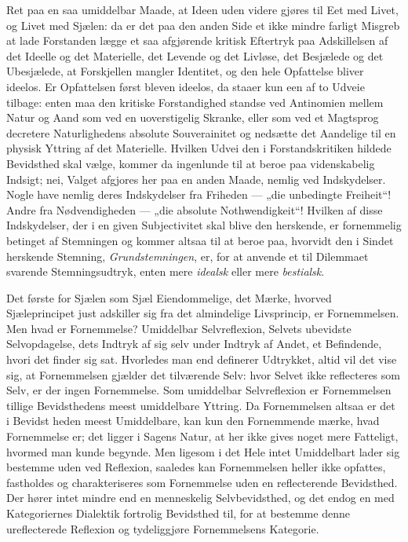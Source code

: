 \documentclass[11pt]{book}
\newcommand{\opage}[1]{\marginnote{\footnotesize\textit{[#1]}}}
\begin{document}
Ret paa en saa umiddelbar Maade, at Ideen uden videre gjøres til Eet med
Livet, og Livet med Sjælen:
\opage{335} \setcounter{footnote}{0}%
da er det paa den anden Side et ikke mindre farligt Misgreb at lade
Forstanden lægge et saa afgjørende kritisk Eftertryk paa Adskillelsen af det
Ideelle og det Materielle, det Levende og det Livløse, det Besjælede og det
Ubesjælede, at Forskjellen mangler Identitet, og den hele Opfattelse bliver
ideelos. Er Opfattelsen først bleven ideelos,
da staaer kun een af to Udveie tilbage: enten maa den kritiske Forstandighed
standse ved Antinomien mellem Natur og Aand som ved en uoverstigelig Skranke,
eller som ved et Magtsprog decretere Naturlighedens absolute Souverainitet og
nedsætte det Aandelige til en physisk Yttring af det Materielle. Hvilken
Udvei den i Forstandskritiken hildede Bevidsthed skal vælge, kommer da
ingenlunde til at beroe paa videnskabelig Indsigt; nei, Valget afgjores her
paa en anden Maade, nemlig ved Indskydelser. Nogle have nemlig deres
Indskydelser fra Friheden --- „die unbedingte Freiheit“! Andre fra
Nødvendigheden --- „die absolute Nothwendigkeit“! Hvilken af disse
Indskydelser, der i en given Subjectivitet skal blive den herskende, er
fornemmelig betinget af Stemningen og kommer altsaa til at beroe paa,
hvorvidt den i Sindet herskende Stemning, \emph{Grundstemningen}, er, for at
anvende et til Dilemmaet svarende Stemningsudtryk, enten mere \emph{idealsk}
eller mere \emph{bestialsk}.

Det første for Sjælen som Sjæl Eiendommelige, det Mærke, hvorved
Sjæleprincipet just adskiller sig fra det almindelige Livsprincip, er
Fornemmelsen. Men hvad er Fornemmelse? Umiddelbar Selvreflexion, Selvets
ubevidste Selvopdagelse, dets Indtryk af sig selv under Indtryk af Andet, et
Befindende, hvori det finder sig sat. Hvorledes man end definerer Udtrykket,
altid vil det vise sig, at Fornemmelsen gjælder det tilværende Selv: hvor
Selvet ikke reflecteres som Selv, er der ingen Fornemmelse. Som umiddelbar
Selvreflexion er Fornemmelsen tillige Bevidsthedens meest umiddelbare
Yttring. Da Fornemmelsen altsaa er det i Bevidst\-%
\opage{336} \setcounter{footnote}{0}%
heden meest Umiddelbare, kan kun den Fornemmende mærke, hvad Fornemmelse er;
det ligger i Sagens Natur, at her ikke gives noget mere Fatteligt, hvormed
man kunde begynde. Men ligesom i det Hele intet Umiddelbart lader sig
bestemme uden ved Reflexion, saaledes kan Fornemmelsen heller ikke opfattes,
fastholdes og charakteriseres som Fornemmelse uden en reflecterende
Bevidsthed. Der hører intet mindre end en menneskelig Selvbevidsthed, og det
endog en med Kategoriernes Dialektik fortrolig Bevidsthed til, for at
bestemme denne ureflecterede Reflexion og tydeliggjøre Fornemmelsens
Kategorie.
\end{document}

